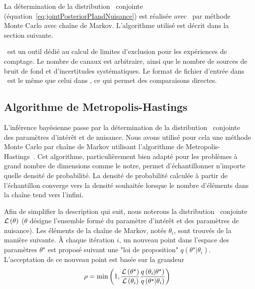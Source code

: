 La d\'etermination de la distribution \posterior~conjointe (\'equation~\ref{eq:jointPosteriorPIandNuisance}) est r\'ealis\'ee avec \roostats~par m\'ethode Monte Carlo avec cha\^ine de Markov. L'algorithme utilis\'e est d\'ecrit dans la section suivante.

\tifosi~est
 un outil d\'edi\'e au calcul de limites d'exclusion pour les exp\'eriences de comptage. Le nombre de canaux est arbitraire, ainsi que le nombre de sources de bruit de fond et d'incertitudes syst\'ematiques. Le format de fichier d'entr\'ee dans \tifosi~est le m\^eme que celui dans \opthylic, ce qui permet des comparaisons directes.

\subsection{Algorithme de Metropolis-Hastings}
\label{sec:MCMC}

L'inf\'erence bay\'esienne passe par la d\'etermination de la distribution \posterior~conjointe des param\`etres d'int\'er\^et et de nuisance. Nous avons utilis\'e pour cela une m\'ethode Monte Carlo par cha\^ine de Markov utilisant l'algorithme de Metropolis-Hastings~\cite{Stuart:436225,delemontex:in2p3-00844359}. 
Cet algorithme,
particuli\`erement bien adapt\'e pour les probl\`emes \`a grand nombre de dimensions comme le notre, 
permet d'\'echantillonner n'importe quelle densit\'e de probabilit\'e.
La densit\'e de probabilit\'e calcul\'ee \`a partir de l'\'echantillon converge vers la densit\'e souhait\'ee lorsque le nombre d'\'el\'ements dans la cha\^ine tend vers l'infini. 

Afin de simplifier la description qui suit, nous noterons la distribution \posterior~conjointe ${\cal L}\left(\theta\right)$ ($\theta$ d\'esigne l'ensemble form\'e du param\`etre d'int\'er\^et et des param\`etres de nuisance). Les \'el\'ements de la cha\^ine de Markov, not\'es $\theta_i$, sont trouv\'es de la mani\`ere suivante. \`A chaque it\'eration $i$, un nouveau point dans l'espace des param\`etres $\theta^\star$ est propos\'e suivant une "loi de proposition" $q\left(\theta^\star|\theta_i\right)$. L'acceptation de ce nouveau point est bas\'ee sur la grandeur
\[\rho=\text{min}\left(1,\frac{{\cal L}\left(\theta^\star\right)}{{\cal L}\left(\theta_i\right)}\frac{q\left(\theta_i|\theta^\star\right)}{q\left(\theta^\star|\theta_i\right)}\right)\]
 
